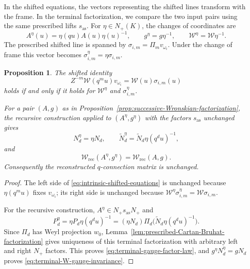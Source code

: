 \documentclass[11pt,leqno]{amsart}
\numberwithin{equation}{section}
\theoremstyle{plain}
\newtheorem{proposition}[theorem]{Proposition}
\theoremstyle{definition}
\theoremstyle{plain}
\theoremstyle{definition}
\theoremstyle{remark}
\begin{document}
In the shifted equations, the vectors representing the shifted lines transform with the frame.  In the terminal factorization, we compare the two input pairs using the same prescribed lifts $s_{\mathrm{as}}$.  For $\eta\in N_+(K)$, the changes of coordinates are
\[
 A^\eta(u)=\eta(qu)A(u)\eta(u)^{-1},\qquad
 g^\eta=g\eta^{-1},\qquad \mathscr W^\eta=\mathscr W\eta^{-1}.
\]
The prescribed shifted line is spanned by $\sigma_{i,m}=\Pi_mv_{\omega_i}$. Under the change of frame this vector becomes $\sigma_{i,m}^\eta=\eta\sigma_{i,m}$.
\begin{proposition}\label{prop:shifted-equations-gauge-covariance}\label{prop:terminal-recursion-gauge-invariance}
The shifted identity
\begin{equation}\label{eq:intrinsic-shifted-equations}
 Z^{-m}\mathscr W(q^mu)v_{\omega_i}
 =\mathscr W(u)\sigma_{i,m}(u)
\end{equation}
holds if and only if it holds for $\mathscr W^\eta$ and $\sigma_{i,m}^\eta$.

For a pair $(A,g)$ as in Proposition~\ref{prop:successive-Wronskian-factorization}, the recursive construction applied to $(A^\eta,g^\eta)$ with the factors $s_{\mathrm{as}}$ unchanged gives
\begin{equation}\label{eq:terminal-gauge-factor-law}
 N_d^\eta=\eta N_d,\qquad
 \widetilde N_d^\eta=\widetilde N_d\eta(q^du)^{-1},
\end{equation}
and
\begin{equation}\label{eq:terminal-W-gauge-invariance}
 \mathscr W_{\mathrm{rec}}(A^\eta,g^\eta)
 =\mathscr W_{\mathrm{rec}}(A,g).
\end{equation}
Consequently the reconstructed $q$-connection matrix is unchanged.
\end{proposition}
\begin{proof}
The left side of \eqref{eq:intrinsic-shifted-equations} is unchanged because $\eta(q^mu)$ fixes $v_{\omega_i}$; its right side is unchanged because $\mathscr W^\eta\sigma_{i,m}^\eta=\mathscr W\sigma_{i,m}$.

For the recursive construction, $A^\eta\in N_+s_{\mathrm{as}}N_+$ and
\[
 P_d^\eta=\eta P_d\eta(q^du)^{-1}
 =(\eta N_d)\Pi_d\bigl(\widetilde N_d\eta(q^du)^{-1}\bigr).
\]
Since $\Pi_d$ has Weyl projection $w_0$, Lemma~\ref{lem:prescribed-Cartan-Bruhat-factorization} gives uniqueness of this terminal factorization with arbitrary left and right $N_+$ factors.  This proves \eqref{eq:terminal-gauge-factor-law}, and $g^\eta N_d^\eta=gN_d$ proves \eqref{eq:terminal-W-gauge-invariance}.
\end{proof}
\end{document}
